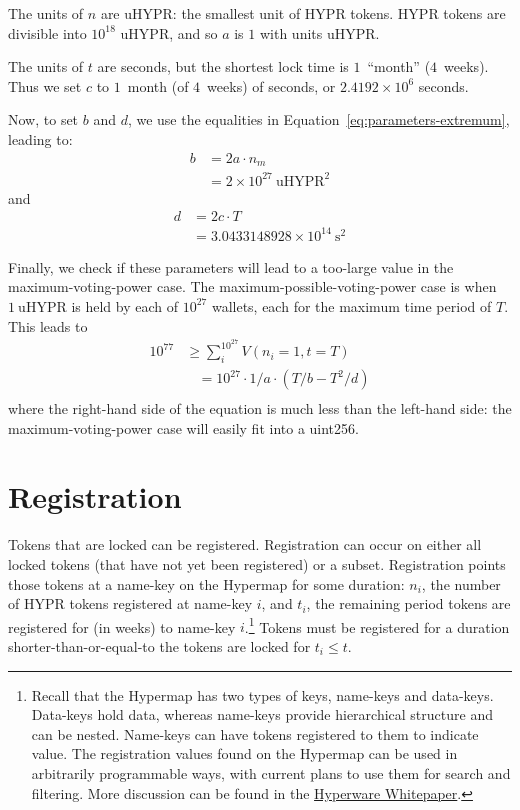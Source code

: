 \documentclass{article}
\begin{document}
The units of $n$ are uHYPR: the smallest unit of HYPR tokens.
HYPR tokens are divisible into $10^{18}$ uHYPR, and so $a$ is $1$ with units uHYPR.

The units of $t$ are seconds, but the shortest lock time is $1$~``month'' ($4$~weeks).
Thus we set $c$ to $1$~month (of $4$~weeks) of seconds, or $2.4192 \times 10^6$ seconds.

Now, to set $b$ and $d$, we use the equalities in Equation~\ref{eq:parameters-extremum}, leading to:
\begin{equation}
\begin{aligned}
b &= 2 a \cdot n_m \\
  &= 2 \times 10^{27}~\text{uHYPR}^2
\end{aligned}
\end{equation}
and
\begin{equation}
\begin{aligned}
d &= 2 c \cdot T \\
  &= 3.0433148928 \times 10^{14}~\text{s}^2
\end{aligned}
\end{equation}

Finally, we check if these parameters will lead to a too-large value in the maximum-voting-power case.
The maximum-possible-voting-power case is when $1~\text{uHYPR}$ is held by each of $10^{27}$ wallets, each for the maximum time period of $T$.
This leads to
\begin{equation}
\begin{aligned}
10^{77} & \geq \sum_i^{10^{27}} V(n_i = 1, t = T) \\
	&~~~~= 10^{27} \cdot 1/a \cdot (T/b - T^2/d) \\
\end{aligned}
\end{equation}
where the right-hand side of the equation is much less than the left-hand side: the maximum-voting-power case will easily fit into a uint256.

\section{Registration}\label{sec:registration}

Tokens that are locked can be registered.
Registration can occur on either all locked tokens (that have not yet been registered) or a subset.
Registration points those tokens at a name-key on the Hypermap for some duration: $n_i$, the number of HYPR tokens registered at name-key $i$, and $t_i$, the remaining period tokens are registered for (in weeks) to name-key $i$.\footnote{
	Recall that the Hypermap has two types of keys, name-keys and data-keys.
	Data-keys hold data, whereas name-keys provide hierarchical structure and can be nested.
	Name-keys can have tokens registered to them to indicate value.
	The registration values found on the Hypermap can be used in arbitrarily programmable ways, with current plans to use them for search and filtering.
	More discussion can be found in the \href{https://hyperware.ai/whitepaper.pdf}{Hyperware Whitepaper}.
}
Tokens must be registered for a duration shorter-than-or-equal-to the tokens are locked for $t_i \leq t$.
\end{document}
